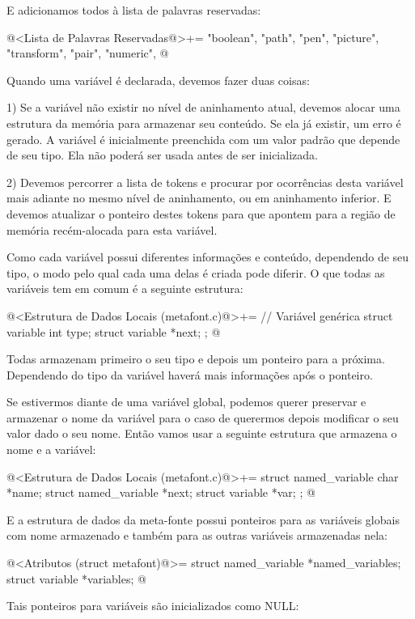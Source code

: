 E adicionamos todos à lista de palavras reservadas:

\iniciocodigo
@<Lista de Palavras Reservadas@>+=
"boolean", "path", "pen", "picture", "transform", "pair", "numeric",
@
\fimcodigo

Quando uma variável é declarada, devemos fazer duas coisas:

1) Se a variável não existir no nível de aninhamento atual, devemos
alocar uma estrutura da memória para armazenar seu conteúdo. Se ela já
existir, um erro é gerado. A variável é inicialmente preenchida com um
valor padrão que depende de seu tipo. Ela não poderá ser usada antes
de ser inicializada.

2) Devemos percorrer a lista de tokens e procurar por ocorrências
desta variável mais adiante no mesmo nível de aninhamento, ou em
aninhamento inferior. E devemos atualizar o ponteiro destes tokens
para que apontem para a região de memória recém-alocada para esta
variável.

Como cada variável possui diferentes informações e conteúdo,
dependendo de seu tipo, o modo pelo qual cada uma delas é criada pode
diferir. O que todas as variáveis tem em comum é a seguinte estrutura:

\iniciocodigo
@<Estrutura de Dados Locais (metafont.c)@>+=
// Variável genérica
struct variable{
  int type;
  struct variable *next;
};
@
\fimcodigo

Todas armazenam primeiro o seu tipo e depois um ponteiro para a
próxima. Dependendo do tipo da variável haverá mais informações
após o ponteiro.

Se estivermos diante de uma variável global, podemos querer preservar
e armazenar o nome da variável para o caso de querermos depois
modificar o seu valor dado o seu nome. Então vamos usar a seguinte
estrutura que armazena o nome e a variável:

\iniciocodigo
@<Estrutura de Dados Locais (metafont.c)@>+=
struct named_variable{
  char *name;
  struct named_variable *next;
  struct variable *var;
};
@
\fimcodigo

E a estrutura de dados da meta-fonte possui ponteiros para as
variáveis globais com nome armazenado e também para as outras
variáveis armazenadas nela:

\iniciocodigo
@<Atributos (struct metafont)@>=
  struct named_variable *named_variables;
  struct variable *variables;
@
\fimcodigo

Tais ponteiros para variáveis são inicializados como NULL:

